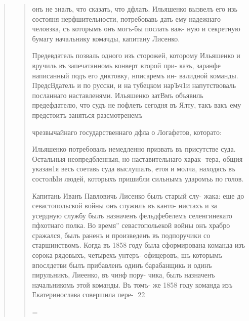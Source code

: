\begin{quote}
\begin{quote}
онъ не зналъ, что сказать, что дфлать. Ильяшенко вызвелъ
его изь состояня нерфшительности, потребовавь дать ему
надежнаго человзка, съ которымъ онъ могъ-бы послать важ-
ную и секретную бумагу начальнику комачды, капитану
Лисенко.

Предевдатель позваль одного изъ сторожей, которому
Ильяшенко и вручиль въ запечатанномь конверт второй при-
казъ, заранфе написанный подъ его диктовку, нписаремъ ин-
валидной команды. ПредсВдатель и по русски, и на тубецком
нарЪч1и напутствоваль посланнаго наставленями. Ильяшенко
затВмъ объявиль предефдателю, что судъ не пофлеть сегодня
въ Ялту, такъ вакъ ему предстоитъ заняться разсмотренемъ

чрезвычайнаго государственнаго дфла о Логафетов, которато:

Ильяшенко потребоваль немедленно призвать въ присутстве
суда. Остальныя неопредбленныя, но наставительнаго харак-
тера, общия указан1я весь соетавь суда выслушалъ, етоя и
молча, находясь въ состолЫи людей, которыхъ пришибли
сильнымъ ударомъь по голов.

Капитань Иванъ Павловичь Лисенко былъ старый слу-
жака: еще до севастопольской войны онъ служилъ въ канто-
нистахъ и за усердную службу былъ назначенъ фельдфебелемъ
селенгинекато пфхотнаго полка. Во время” севастопольекой
войны онъ храбро сражался, былъ раненъ и произведенъ въ
подпоручики со старшинствомъ. Когда въ 1858 году была
сформирована команда изъ сорока рядовыхъ, четырехъ унтеръ-
офицеровъ, шъ которымъ впослдетви былъ прибавленъ одинъ
барабанщикь и одинъ пирульникъ, Лиеенко, въ чинф пору-
чика, былъ назначенъ начальникомь этой команды. Въ томъ-
же 1858 году команда изъ Екатеринослава совершила пере-
22

=


\end{quote}
\end{quote}
